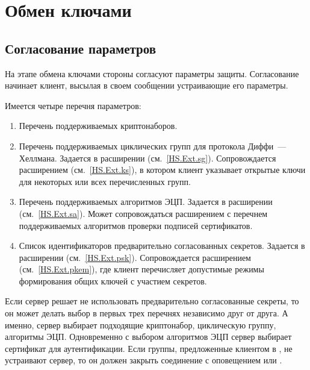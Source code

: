 \section{Обмен ключами}\label{HS.KeyExchange}

\subsection{Согласование параметров}\label{HS.Negot} 

На этапе обмена ключами стороны согласуют параметры защиты.
%
Согласование начинает клиент, высылая в своем сообщении 
 устраивающие его параметры.

Имеется четыре перечня параметров:
\begin{enumerate}
\item
Перечень поддерживаемых криптонаборов.

\item
Перечень поддерживаемых циклических групп для протокола Диффи~--- Хеллмана.
Задается в расширении  (см.~\ref{HS.Ext.sg}). 
Сопровождается расширением  (см.~\ref{HS.Ext.ks}), в котором 
клиент указывает открытые ключи для некоторых или всех перечисленных групп.

\item
Перечень поддерживаемых алгоритмов ЭЦП. Задается в расширении 
 (см.~\ref{HS.Ext.sa}).
%
Может сопровождаться расширением  
с перечнем поддерживаемых алгоритмов проверки подписей сертификатов.

\item
Список идентификаторов предварительно согласованных секретов.
Задается в расширении  (см.~\ref{HS.Ext.psk}).
%
Сопровождается расширением  
(см.~\ref{HS.Ext.pkem}), где клиент перечисляет допустимые режимы формирования  
общих ключей с участием секретов.
\end{enumerate}

Если сервер решает не использовать предварительно согласованные секреты, то он 
может делать выбор в первых трех перечнях независимо друг от друга. А именно, 
сервер выбирает подходящие криптонабор, циклическую группу, алгоритмы ЭЦП. 
Одновременно с выбором алгоритмов ЭЦП сервер выбирает сертификат для 
аутентификации.
%
Если группы, предложенные клиентом в , не 
устраивают сервер, то он должен закрыть соединение с оповещением 
 или 
.

